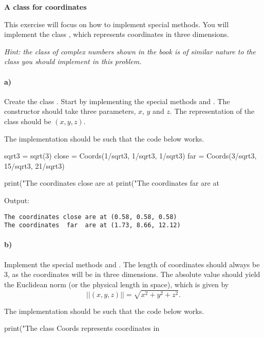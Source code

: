 \begin{Problem} {\textbf{A class for coordinates}}

\noindent
This exercise will focus on how to implement special methods. You will implement the class , which represents coordinates in three dimensions. 

\emph{Hint: the class of complex numbers shown in the book is of similar nature to the class you should implement in this problem.}



\paragraph{a)} Create the class . Start by implementing the special methods  and .  The constructor should take three parameters, $x$, $y$ and $z$. The representation of the class should be $(x, y, z)$.

The implementation should be such that the code below works.
\begin{python}
sqrt3 = sqrt(3)
close = Coords(1/sqrt3, 1/sqrt3, 1/sqrt3)
far = Coords(3/sqrt3, 15/sqrt3, 21/sqrt3)

print("The coordinates close are at %
print("The coordinates  far  are at %
\end{python}
Output:
\begin{lstlisting}
The coordinates close are at (0.58, 0.58, 0.58)
The coordinates  far  are at (1.73, 8.66, 12.12)
\end{lstlisting}


\paragraph{b)} Implement the special methods  and . The length of coordinates should always be 3, as the coordinates will be in three dimensions. The absolute value should yield the Euclidean norm (or the physical length in space), which is given by
\begin{equation*}
    ||(x, y, z)||= \sqrt{x^2 + y^2 + z^2} .
\end{equation*}

The implementation should be such that the code below works.
\begin{python}
print("The class Coords represents coordinates in \


\end{python}
\end{Problem}

